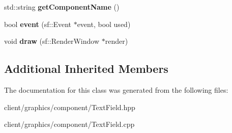 \begin{DoxyCompactItemize}
\item 
\hypertarget{classgraphics_1_1_text_field_a8c9d0ad1fa1fea11bb2b9e6a31e6c83d}{std\-::string {\bfseries get\-Component\-Name} ()}\label{classgraphics_1_1_text_field_a8c9d0ad1fa1fea11bb2b9e6a31e6c83d}

\item 
\hypertarget{classgraphics_1_1_text_field_afbde779e30a3db7ffc037e1a09efb9cb}{bool {\bfseries event} (sf\-::\-Event $\ast$event, bool used)}\label{classgraphics_1_1_text_field_afbde779e30a3db7ffc037e1a09efb9cb}

\item 
\hypertarget{classgraphics_1_1_text_field_a77a1ba6475afe40f4e8cd53fa091cfbe}{void {\bfseries draw} (sf\-::\-Render\-Window $\ast$render)}\label{classgraphics_1_1_text_field_a77a1ba6475afe40f4e8cd53fa091cfbe}

\end{DoxyCompactItemize}
\subsection*{Additional Inherited Members}


The documentation for this class was generated from the following files\-:\begin{DoxyCompactItemize}
\item 
client/graphics/component/Text\-Field.\-hpp\item 
client/graphics/component/Text\-Field.\-cpp\end{DoxyCompactItemize}
